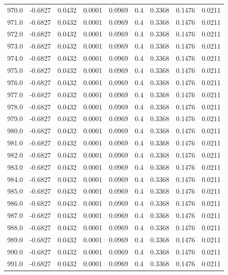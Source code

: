 \begin{longtable}{lrrrrrrrr}
970.0 & -0.6827 & 0.0432 & 0.0001 & 0.0969 & 0.4 & 0.3368 & 0.1476 & 0.0211 \\
971.0 & -0.6827 & 0.0432 & 0.0001 & 0.0969 & 0.4 & 0.3368 & 0.1476 & 0.0211 \\
972.0 & -0.6827 & 0.0432 & 0.0001 & 0.0969 & 0.4 & 0.3368 & 0.1476 & 0.0211 \\
973.0 & -0.6827 & 0.0432 & 0.0001 & 0.0969 & 0.4 & 0.3368 & 0.1476 & 0.0211 \\
974.0 & -0.6827 & 0.0432 & 0.0001 & 0.0969 & 0.4 & 0.3368 & 0.1476 & 0.0211 \\
975.0 & -0.6827 & 0.0432 & 0.0001 & 0.0969 & 0.4 & 0.3368 & 0.1476 & 0.0211 \\
976.0 & -0.6827 & 0.0432 & 0.0001 & 0.0969 & 0.4 & 0.3368 & 0.1476 & 0.0211 \\
977.0 & -0.6827 & 0.0432 & 0.0001 & 0.0969 & 0.4 & 0.3368 & 0.1476 & 0.0211 \\
978.0 & -0.6827 & 0.0432 & 0.0001 & 0.0969 & 0.4 & 0.3368 & 0.1476 & 0.0211 \\
979.0 & -0.6827 & 0.0432 & 0.0001 & 0.0969 & 0.4 & 0.3368 & 0.1476 & 0.0211 \\
980.0 & -0.6827 & 0.0432 & 0.0001 & 0.0969 & 0.4 & 0.3368 & 0.1476 & 0.0211 \\
981.0 & -0.6827 & 0.0432 & 0.0001 & 0.0969 & 0.4 & 0.3368 & 0.1476 & 0.0211 \\
982.0 & -0.6827 & 0.0432 & 0.0001 & 0.0969 & 0.4 & 0.3368 & 0.1476 & 0.0211 \\
983.0 & -0.6827 & 0.0432 & 0.0001 & 0.0969 & 0.4 & 0.3368 & 0.1476 & 0.0211 \\
984.0 & -0.6827 & 0.0432 & 0.0001 & 0.0969 & 0.4 & 0.3368 & 0.1476 & 0.0211 \\
985.0 & -0.6827 & 0.0432 & 0.0001 & 0.0969 & 0.4 & 0.3368 & 0.1476 & 0.0211 \\
986.0 & -0.6827 & 0.0432 & 0.0001 & 0.0969 & 0.4 & 0.3368 & 0.1476 & 0.0211 \\
987.0 & -0.6827 & 0.0432 & 0.0001 & 0.0969 & 0.4 & 0.3368 & 0.1476 & 0.0211 \\
988.0 & -0.6827 & 0.0432 & 0.0001 & 0.0969 & 0.4 & 0.3368 & 0.1476 & 0.0211 \\
989.0 & -0.6827 & 0.0432 & 0.0001 & 0.0969 & 0.4 & 0.3368 & 0.1476 & 0.0211 \\
990.0 & -0.6827 & 0.0432 & 0.0001 & 0.0969 & 0.4 & 0.3368 & 0.1476 & 0.0211 \\
991.0 & -0.6827 & 0.0432 & 0.0001 & 0.0969 & 0.4 & 0.3368 & 0.1476 & 0.0211 \\

\end{longtable}
